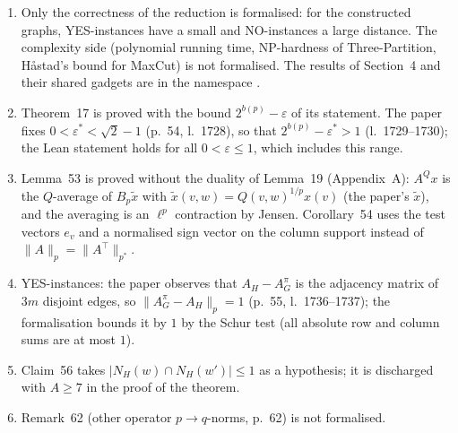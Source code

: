 \documentclass[10pt,a4paper]{article}
\newcommand{\lean}[1]{\textcolor{blue!50!black}{\texttt{\detokenize{#1}}}}
\begin{document}
\begin{enumerate}[leftmargin=*]
\item Only the correctness of the reduction is formalised: for the constructed graphs, YES-instances have a small and NO-instances a large distance. The complexity side (polynomial running time, NP-hardness of Three-Partition, H\aa{}stad's bound for MaxCut) is not formalised. The results of Section~4 and their shared gadgets are in the namespace \lean{GsimOT.Hardness}.
\item Theorem~17 is proved with the bound $2^{b(p)}-\varepsilon$ of its statement. The paper fixes $0<\varepsilon^*<\sqrt2-1$ (p.~54, l.~1728), so that $2^{b(p)}-\varepsilon^*>1$ (l.~1729--1730); the Lean statement holds for all $0<\varepsilon\le1$, which includes this range.
\item Lemma~53 is proved without the duality of Lemma~19 (Appendix~A): $A^Qx$ is the $Q$-average of $B_p\tilde x$ with $\tilde x(v,w)=Q(v,w)^{1/p}x(v)$ (the paper's $\tilde x$), and the averaging is an $\ell^p$ contraction by Jensen. Corollary~54 uses the test vectors $e_v$ and a normalised sign vector on the column support instead of $\|A\|_p=\|A^\top\|_{p^*}$.
\item YES-instances: the paper observes that $A_H-A^\pi_G$ is the adjacency matrix of $3m$ disjoint edges, so $\|A^\pi_G-A_H\|_p=1$ (p.~55, l.~1736--1737); the formalisation bounds it by $1$ by the Schur test (all absolute row and column sums are at most $1$).
\item Claim~56 takes $|N_H(w)\cap N_H(w')|\le1$ as a hypothesis; it is discharged with $A\ge7$ in the proof of the theorem.
\item Remark~62 (other operator $p\to q$-norms, p.~62) is not formalised.
\end{enumerate}
\end{document}
